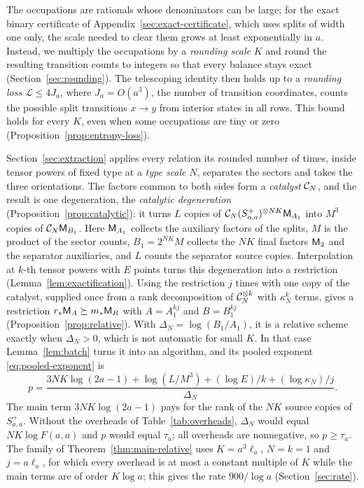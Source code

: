 The occupations are rationals whose denominators can be large; for the
exact binary certificate of Appendix~\ref{sec:exact-certificate}, which
uses splits of width one only, the scale needed to clear them grows at
least exponentially in \(a\). Instead, we multiply the
occupations by a \emph{rounding scale} \(K\) and round the resulting
transition counts to integers so that every balance stays exact
(Section~\ref{sec:rounding}). The telescoping identity then holds up to
a \emph{rounding loss} \(\mathcal L\le4J_a\), where \(J_a=O(a^3)\), the
number of transition coordinates, counts the possible split transitions
\(x\to y\) from interior states in all rows. This bound holds for every \(K\), even when some
occupations are tiny or zero (Proposition~\ref{prop:entropy-loss}).

Section~\ref{sec:extraction} applies every relation its rounded number
of times, inside tensor powers of fixed type at a \emph{type scale}
\(N\), separates the sectors and takes the three orientations. The
factors common to both sides form a \emph{catalyst} \(\mathcal C_N\), and the
result is one degeneration, the \emph{catalytic degeneration}
(Proposition~\ref{prop:catalytic}): it turns \(L\) copies of
\(\mathcal C_N(S^+_{a,a})^{\otimes NK}\mathsf M_{A_1}\) into \(M^3\) copies of
\(\mathcal C_N\mathsf M_{B_1}\). Here \(\mathsf M_{A_1}\) collects the auxiliary factors of
the splits, \(M\) is the product of the sector counts,
\(B_1=2^{NK}M\) collects the \(NK\) final factors \(\mathsf M_2\) and the
separator auxiliaries, and \(L\) counts the separator source copies.
Interpolation at \(k\)-th tensor powers with \(E\) points turns this
degeneration into a restriction (Lemma~\ref{lem:exactification}). Using
the restriction \(j\) times with one copy of the catalyst, supplied once
from a rank decomposition of \(\mathcal C_N^{\otimes k}\) with \(\kappa_N^k\)
terms, gives a restriction \(r_*\mathsf M_A\succeq m_*\mathsf M_B\) with
\(A=A_1^{kj}\) and \(B=B_1^{kj}\) (Proposition~\ref{prop:relative}).
With \(\Delta_N=\log(B_1/A_1)\), it is a relative scheme exactly when
\(\Delta_N>0\), which is not automatic for small \(K\). In that case
Lemma~\ref{lem:batch} turns it into an algorithm, and its pooled
exponent \eqref{eq:pooled-exponent} is
\begin{equation}\label{eq:intro-exponent}
 p=\frac{3NK\log(2a-1)+\log(L/M^3)+(\log E)/k
        +(\log\kappa_N)/j}{\Delta_N}.
\end{equation}
The main term \(3NK\log(2a-1)\) pays for the rank of the \(NK\) source
copies of \(S^+_{a,a}\). Without the overheads of
Table~\ref{tab:overheads}, \(\Delta_N\) would equal \(NK\log F(a,a)\) and
\(p\) would equal \(\tau_a\); all overheads are nonnegative, so
\(p\ge\tau_a\). The family of Theorem~\ref{thm:main-relative} uses
\(K=a^3\ell_a\), \(N=k=1\) and \(j=a\ell_a\), for which every overhead
is at most a constant multiple of \(K\) while the main terms are of
order \(K\log a\); this gives the rate \(900/\log a\)
(Section~\ref{sec:rate}).


